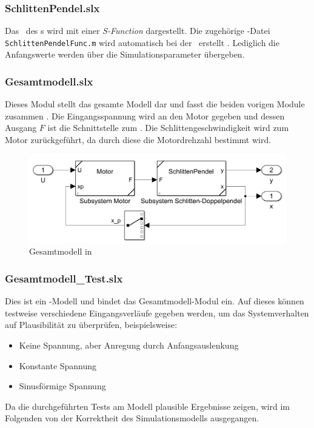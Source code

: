 \subsubsection{SchlittenPendel.slx}
Das \zrm\ des \spds s wird mit einer \emph{S-Function} dargestellt.
Die zugehörige \ml-Datei \texttt{SchlittenPendelFunc.m} wird automatisch bei der \init\ erstellt .
Lediglich die Anfangswerte werden über die Simulationsparameter übergeben.

\subsubsection{Gesamtmodell.slx}\label{sec:gesamtslx}
Dieses Modul stellt das gesamte Modell dar und fasst die beiden vorigen Module zusammen .
Die Eingangsspannung wird an den Motor gegeben und dessen Ausgang $F$ ist die Schnittstelle zum \sdpd.
Die Schlittengeschwindigkeit wird zum Motor zurückgeführt, da durch diese die Motordrehzahl bestimmt wird.
\begin{figure}
	\centering
		\includegraphics[scale=0.4]{Bilder/Simulink/gesamtmodell.PNG}
	\caption{Gesamtmodell in \sm}
	\label{fig:simges}
\end{figure}

\subsubsection{Gesamtmodell\_Test.slx}
Dies ist ein \sm-Modell und bindet das Gesamtmodell-Modul ein.
Auf dieses können testweise verschiedene Eingangsverläufe gegeben werden, um das Systemverhalten auf Plausibilität zu überprüfen, beispielsweise:
\begin{itemize}
	\item Keine Spannung, aber Anregung durch Anfangsauslenkung
	\item Konstante Spannung
	\item Sinusförmige Spannung
\end{itemize}
Da die durchgeführten Tests am Modell plausible Ergebnisse zeigen, wird im Folgenden von der Korrektheit des Simulationsmodells ausgegangen.


